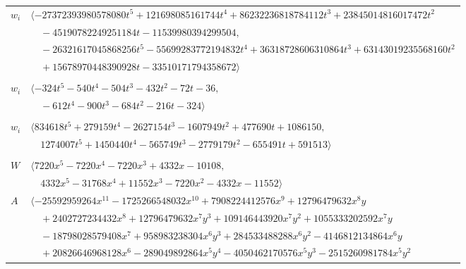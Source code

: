\documentclass[11pt]{article}
\begin{document}
\begin{longtable}{@{}ll@{}}
$w_i$ & $\langle -27372393980578080t^{5}+121698085161744t^{4}+86232236818784112t^{3}+23845014816017472t^{2}$\\
 & $\quad -45190782249251184t-11539980394299504,$\\
 & $\quad -26321617045868256t^{5}-55699283772194832t^{4}+36318728606310864t^{3}+63143019235568160t^{2}$\\
 & $\quad +15678970448390928t-33510171794358672\rangle$\\
\addlinespace[2pt]
\multicolumn{2}{@{}p{0.97\textwidth}@{}}{$i=53$, $D_i=12$, $\rho_{ij}$: $1{:}2, \allowbreak 2{:}2, \allowbreak 14{:}2, \allowbreak 16{:}2, \allowbreak 35{:}1, \allowbreak 44{:}2$}\\
$w_i$ & $\langle -324t^{5}-540t^{4}-504t^{3}-432t^{2}-72t-36,$\\
 & $\quad -612t^{4}-900t^{3}-684t^{2}-216t-324\rangle$\\
\addlinespace[2pt]
\multicolumn{2}{@{}p{0.97\textwidth}@{}}{$i=54$, $D_i=1$, $\rho_{ij}$: $0{:}2, \allowbreak 1{:}2, \allowbreak 2{:}2, \allowbreak 3{:}2, \allowbreak 6{:}1, \allowbreak 7{:}2, \allowbreak 8{:}1, \allowbreak 12{:}1, \allowbreak 14{:}1, \allowbreak 18{:}2, \allowbreak 21{:}2, \allowbreak 27{:}2, \allowbreak 29{:}1, \allowbreak 31{:}2, \allowbreak 34{:}2, \allowbreak 35{:}1, \allowbreak 49{:}2, \allowbreak 50{:}2, \allowbreak 52{:}1, \allowbreak 58{:}2$}\\
$w_i$ & $\langle 834618t^{5}+279159t^{4}-2627154t^{3}-1607949t^{2}+477690t+1086150,$\\
 & $\quad 1274007t^{5}+1450440t^{4}-565749t^{3}-2779179t^{2}-655491t+591513\rangle$\\
\addlinespace[2pt]
\multicolumn{2}{@{}p{0.97\textwidth}@{}}{$i=55$, $D_i=5776$, $\rho_{ij}$: $4{:}2, \allowbreak 6{:}2, \allowbreak 8{:}2, \allowbreak 20{:}2, \allowbreak 27{:}1, \allowbreak 36{:}2, \allowbreak 48{:}1$}\\
$W$ & $\langle 7220x^{5}-7220x^{4}-7220x^{3}+4332x-10108,$\\
 & $\quad 4332x^{5}-31768x^{4}+11552x^{3}-7220x^{2}-4332x-11552\rangle$\\
$A$ & $\langle -25592959264x^{11}-1725266548032x^{10}+7908224412576x^{9}+12796479632x^{8}y$\\
 & $\quad +2402727234432x^{8}+12796479632x^{7}y^{3}+109146443920x^{7}y^{2}+1055333202592x^{7}y$\\
 & $\quad -18798028579408x^{7}+958983238304x^{6}y^{3}+284533488288x^{6}y^{2}-4146812134864x^{6}y$\\
 & $\quad +20826646968128x^{6}-289049892864x^{5}y^{4}-4050462170576x^{5}y^{3}-2515260981784x^{5}y^{2}$\\

\end{longtable}
\end{document}
